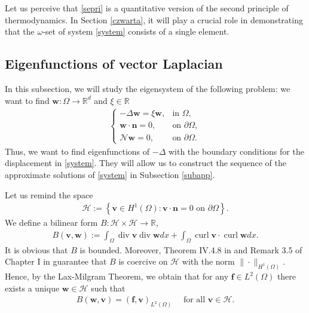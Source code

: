 \documentclass[11pt]{article}
\numberwithin{equation}{section}
\theoremstyle{plain}
\newcommand\bb[1]{\mathbf{#1}}
\renewcommand{\r}{\mathbb{R}}
\newcommand{\rn}{\mathbb{R}^d}
\newcommand{\tn}{\Omega}
\newcommand{\io}{\int_{\Omega}}
\renewcommand{\hom}{H^1(\tn)}
\newcommand{\ld}{L^2(\Omega)}
\renewcommand{\div}{\operatorname{div}}
\DeclareMathOperator{\curl}{curl}
\newcommand{\N}{\mathcal{N}}
\renewcommand{\H}{\mathcal{H}}
\begin{document}
Let us perceive that \eqref{sepri} is a quantitative version of the second principle of thermodynamics. In Section \ref{czwarta}, it will play a crucial role in demonstrating that the $\omega$-set of system \eqref{system} consists of a single element.

\subsection{Eigenfunctions of vector Laplacian}\label{sublap}
In this subsection, we will study the eigensystem of the following problem: we want to find $\bb w\colon\Omega\to\rn$ and $\xi\in\r$
\begin{align}\label{probeig}
\begin{cases}
-\Delta\bb w=\xi\bb w, & \textrm{in } \Omega,\\
\bb w\cdot\bb n=0, & \textrm{on } \partial\Omega,\\
\N\bb w=0, & \textrm{on } \partial\Omega. 
\end{cases}
\end{align}
Thus, we want to find eigenfunctions of $-\Delta$ with the boundary conditions for the displacement in \eqref{system}. They will allow us to construct the sequence of the approximate solutions of \eqref{system} in Subsection \ref{subapp}.

Let us remind the space
\begin{align*}
\H:=\left\{\bb v\in\hom\colon \bb v\cdot \bb n=0 \textrm{ on }\partial\Omega\right\}.
\end{align*}
We define a bilinear form $B\colon\H\times\H\to\r$,
\begin{align}\label{scprod}
B(\bb v,\bb w):=\io\div\bb v\div\bb wdx+\io\curl\bb v\cdot\curl\bb wdx.
\end{align}
It is obvious that $B$ is bounded. Moreover, Theorem IV.4.8 in \cite{Boyer} and Remark 3.5 of Chapter I in \cite{G-R} guarantee that $B$ is coercive on $\H$ with the norm $\|\cdot\|_{\hom}$. Hence, by the Lax-Milgram Theorem, we obtain that for any $\bb f\in\ld$ there exists a unique $\bb w\in\H$ such that 
\begin{align*}
B(\bb w, \bb v)=(\bb f,\bb v)_{\ld}\quad \textrm{ for all }\bb v\in\H.
\end{align*}
\end{document}
